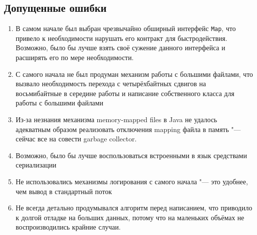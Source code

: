 \documentclass[a4paper]{article}
\renewcommand{\t}{\texttt}
\begin{document}
\subsection{Допущенные ошибки}
  \begin{enumerate}
  \item В самом начале был выбран чрезвычайно обширный интерфейс \t{Map}, что привело к необходимости
        нарушать его контракт для быстродействия. Возможно, было бы лучше взять своё сужение данного
        интерфейса и расширять его по мере необходимости.
  \item С самого начала не был продуман механизм работы с большими файлами, что вызвало необходимость
        перехода с четырёхбайтных сдвигов на восьмибайтные в середине работы и написание собственного
        класса для работы с большими файлами
  \item Из-за незнания механизма memory-mapped files в Java не удалось адекватным образом реализовать
        отключения mapping файла в память "--- сейчас все на совести garbage collector.
  \item Возможно, было бы лучше воспользоваться встроенными в язык средствами сериализации
  \item Не использовались механизмы логирования с самого начала "--- это удобнее, чем вывод в стандартный
        поток
  \item Не всегда детально продумывался алгоритм перед написанием, что приводило к долгой отладке на
        больших данных, потому что на маленьких объёмах не воспроизводились крайние случаи.
  \end{enumerate}
\end{document}
